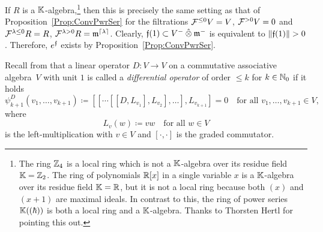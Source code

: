 \documentclass[\MainFolder/Text.tex]{subfiles}
\begin{document}
If $R$ is a $\mathbb{K}$-algebra,\footnote{The ring $\mathbb{Z}_4$ is a local ring which is not a $\mathbb{K}$-algebra over its residue field $\mathbb{K}=\mathbb{Z}_2$. The ring of polynomials $\mathbb{R}[x]$ in a single variable $x$ is a $\mathbb{K}$-algebra over its residue field $\mathbb{K}=\mathbb{R}$, but it is not a local ring because both $(x)$ and $(x+1)$ are maximal ideals. In contrast to this, the ring of power series $\mathbb{K}((\hbar))$ is both a local ring and a $\mathbb{K}$-algebra. Thanks to Thorsten Hertl for pointing this out.} then this is precisely the same setting as that of Proposition~\ref{Prop:ConvPwrSer} for the filtrations $\mathcal{F}^{\le 0} V = V$, $\mathcal{F}^{>0} V= 0$ and $\mathcal{F}^{\lambda\le 0} R = R$, $\mathcal{F}^{\lambda>0} R = \mathfrak{m}^{\lceil\lambda\rceil}$. Clearly, $\HTP(1)\subset V^- \COtimes \mathfrak{m}^-$ is equivalent to $\Norm{\HTP(1)}>0$. Therefore, $e^{\mathfrak{f}}$ exists by Proposition~\ref{Prop:ConvPwrSer}.

Recall from \cite[p.\,5]{Markl2015} that a linear operator $D: V\rightarrow V$ on a commutative associative algebra~$V$ with unit $1$ is called a \emph{differential operator} of order $\le k$ for $k\in \mathbb{N}_0$ if it holds\label{Page:DiffOp}
\[ \psi^D_{k+1}(v_1, \dotsc, v_{k+1}) \coloneqq [[\dotsb[[D,L_{v_1}],L_{v_2}],\dotsc],L_{v_{k+1}}] = 0 \quad\text{for all }v_1, \dotsc, v_{k+1}\in V, \]
where 
\[ L_v(w) \coloneqq v w\quad\text{for all }w\in V \]
is the left-multiplication with $v\in V$ and $[\cdot,\cdot]$ is the graded commutator. 

%
\end{document}
